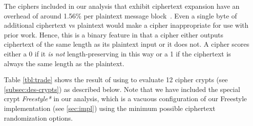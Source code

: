 The ciphers included in our analysis that exhibit ciphertext expansion have an
overhead of around 1.56\% per plaintext message block~\cite{Freestyle}. Even a
single byte of additional ciphertext vs plaintext would make a cipher
inappropriate for use with prior work. Hence, this is a binary feature in that a
cipher either outputs ciphertext of the same length as its plaintext input or it
does not. A cipher scores either a 0 if it {\em is not} length-preserving in
this way or a 1 if the ciphertext is always the same length as the plaintext.

Table \cref{tbl:trade} shows the result of using \sysC to evaluate 12 cipher
crypts (see \cref{subsec:des-crypts}) as described below. Note that we have
included the special crypt {\em Freestyle*} in our analysis, which is a vacuous
configuration of our Freestyle implementation (see \cref{sec:impl}) using the
minimum possible ciphertext randomization options.



